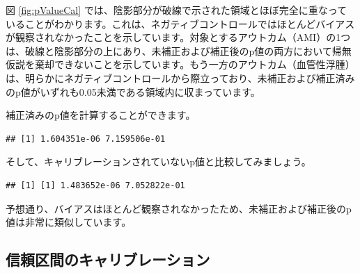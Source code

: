\documentclass[
  11pt]{book}
\newenvironment{Shaded}{\begin{snugshade}}{\end{snugshade}}
\newcommand{\AttributeTok}[1]{\textcolor[rgb]{0.13,0.29,0.53}{#1}}
\newcommand{\FunctionTok}[1]{\textcolor[rgb]{0.13,0.29,0.53}{\textbf{#1}}}
\newcommand{\NormalTok}[1]{#1}
\newcommand{\OtherTok}[1]{\textcolor[rgb]{0.56,0.35,0.01}{#1}}
\newcommand{\SpecialCharTok}[1]{\textcolor[rgb]{0.81,0.36,0.00}{\textbf{#1}}}
\theoremstyle{definition}
\theoremstyle{definition}
\theoremstyle{definition}
\theoremstyle{definition}
\theoremstyle{remark}
\begin{document}
図 \ref{fig:pValueCal} では、陰影部分が破線で示された領域とほぼ完全に重なっていることがわかります。これは、ネガティブコントロールではほとんどバイアスが観察されなかったことを示しています。対象とするアウトカム（AMI）の1つは、破線と陰影部分の上にあり、未補正および補正後のp値の両方において帰無仮説を棄却できないことを示しています。もう一方のアウトカム（血管性浮腫）は、明らかにネガティブコントロールから際立っており、未補正および補正済みのp値がいずれも0.05未満である領域内に収まっています。

補正済みのp値を計算することができます。

\begin{Shaded}
\end{Shaded}

\begin{verbatim}
## [1] 1.604351e-06 7.159506e-01
\end{verbatim}

そして、キャリブレーションされていないp値と比較してみましょう。

\begin{Shaded}
\end{Shaded}

\begin{verbatim}
## [1] [1] 1.483652e-06 7.052822e-01
\end{verbatim}

予想通り、バイアスはほとんど観察されなかったため、未補正および補正後のp値は非常に類似しています。

\subsection{信頼区間のキャリブレーション}\label{ux4fe1ux983cux533aux9593ux306eux30adux30e3ux30eaux30d6ux30ecux30fcux30b7ux30e7ux30f3-1}
\end{document}
